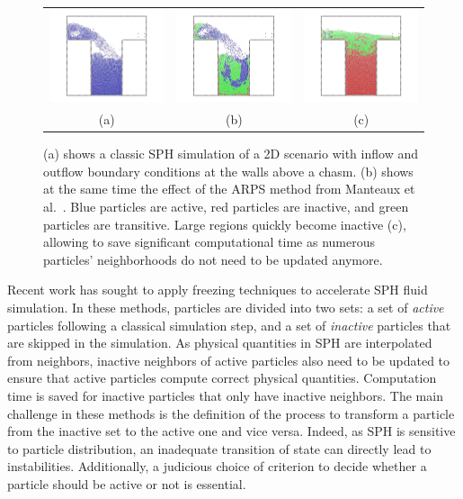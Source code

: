 \begin{figure}[t]
\centering
\begin{tabular}{ccc}
\includegraphics[width=.32\linewidth]{images/starAdaptivity-cgf2016/PermanentFlowSPH.png} &
\includegraphics[width=.32\linewidth]{images/starAdaptivity-cgf2016/PermanentFlowARPSColor.png} &
\includegraphics[width=.32\linewidth]{images/starAdaptivity-cgf2016/PermanentFlowARPSColor2.png} \\
(a) & (b) & (c)
\end{tabular}
\caption[STAR adaptivity: SPH fluid freezing]{\label{fig:SPHfreezing}
(a) shows a classic SPH simulation of a 2D scenario with inflow and outflow boundary conditions at the walls above a chasm. (b) shows at the same time the effect of the ARPS method from Manteaux et al.~\cite{Manteaux2013}. Blue particles are active, red particles are inactive, and green particles are transitive. Large regions quickly become inactive (c), allowing to save significant computational time as numerous particles' neighborhoods do not need to be updated anymore.}
\end{figure}

Recent work has sought to apply freezing techniques to accelerate SPH fluid simulation.
In these methods, particles are divided into two sets: a set of \emph{active} particles following a classical simulation step, and a set of \emph{inactive} particles that are skipped in the simulation.
As physical quantities in SPH are interpolated from neighbors, inactive neighbors of active particles also need to be updated to ensure that active particles compute correct physical quantities.
Computation time is saved for inactive particles that only have inactive neighbors.
The main challenge in these methods is the definition of the process to transform a particle from the inactive set to the active one and vice versa.
Indeed, as SPH is sensitive to particle distribution, an inadequate transition of state can directly lead to instabilities.
Additionally, a judicious choice of criterion to decide whether a particle should be active or not is essential.

